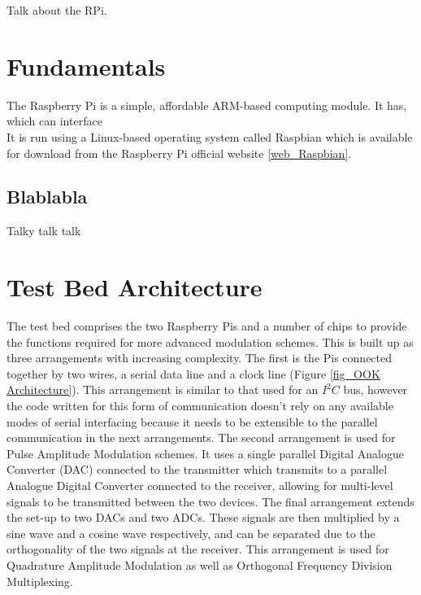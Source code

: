 \documentclass[../main.tex]{subfiles}
\begin{document}
Talk about the RPi.


\section{Fundamentals}

The Raspberry Pi is a simple, affordable ARM-based computing module. It has, which can interface\\

It is run using a Linux-based operating system called Raspbian which is available for download from the Raspberry Pi official website \ref{web_Raspbian}.\\

\subsection{Blablabla}
Talky talk talk

	
\section{Test Bed Architecture}

The test bed comprises the two Raspberry Pis and a number of chips to provide the functions required for more advanced modulation schemes.
This is built up as three arrangements with increasing complexity.
The first is the Pis connected together by two wires, a serial data line and a clock line (Figure \ref{fig_OOK Architecture}).
This arrangement is similar to that used for an $I^2C$ bus, however the code written for this form of communication doesn't rely on any available modes of serial interfacing because it needs to be extensible to the parallel communication in the next arrangements.
The second arrangement is used for Pulse Amplitude Modulation schemes.
It uses a single parallel Digital Analogue Converter (DAC) connected to the transmitter which transmits to a parallel Analogue Digital Converter connected to the receiver, allowing for multi-level signals to be transmitted between the two devices.
The final arrangement extends the set-up to two DACs and two ADCs.
These signals are then multiplied by a sine wave and a cosine wave respectively, and can be separated due to the orthogonality of the two signals at the receiver.
This arrangement is used for Quadrature Amplitude Modulation as well as Orthogonal Frequency Division Multiplexing.\\
\end{document}
